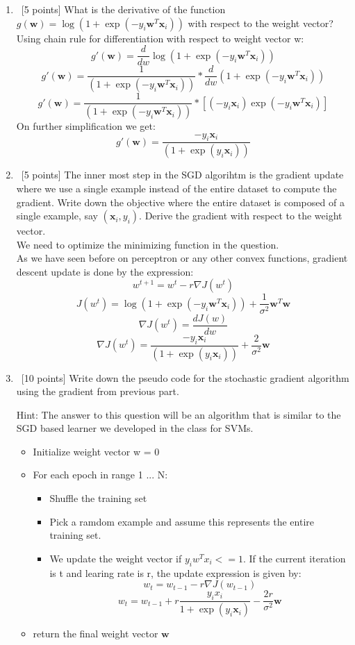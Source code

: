 \begin{enumerate}
\item~[5 points] What is the derivative of the function
  $g(\mathbf{w})=\log(1+\exp(-y_i \mathbf{w}^T\mathbf{x}_i))$ with
  respect to the weight vector?\\
  Using chain rule for differentiation with respect to weight vector w:\\
  \[g'(\mathbf{w})=\frac{d}{dw}\log(1+\exp(-y_i \mathbf{w}^T\mathbf{x}_i))\]
  \[g'(\mathbf{w})=\frac{1}{(1+\exp(-y_i \mathbf{w}^T\mathbf{x}_i))}*\frac{d}{dw}(1+\exp(-y_i \mathbf{w}^T\mathbf{x}_i))\]
  \[g'(\mathbf{w})=\frac{1}{(1+\exp(-y_i \mathbf{w}^T\mathbf{x}_i))}*[(-y_i \mathbf{x}_i)\exp(-y_i\mathbf{w}^T\mathbf{x}_i)]\]
  On further simplification we get:
  \[g'(\mathbf{w})=\frac{-y_i \mathbf{x}_i}{(1+\exp(y_i \mathbf{x}_i))}\]

\item~[5 points] The inner most step in the SGD algorihtm is the
  gradient update where we use a single example instead of the entire
  dataset to compute the gradient.  Write down the objective where the
  entire dataset is composed of a single example, say
  $(\mathbf{x}_i, y_i)$.  Derive the gradient with respect to the
  weight vector.\\
  We need to optimize the minimizing function in the question.\\
  As we have seen before on perceptron or any other convex functions, gradient descent update is done by the expression:\\
  \[w^{t+1} = w^t - r\nabla J(w^t)\]
  \[J(w^t) = \log(1+\exp(-y_i \mathbf{w}^T\mathbf{x}_i)) + \frac{1}{\sigma^2}\mathbf{w}^T\mathbf{w} \]
    \[\nabla J(w^t) = \frac{dJ(w)}{dw}\]
    \[\nabla J(w^t) = \frac{-y_i \mathbf{x}_i}{(1+\exp(y_i \mathbf{x}_i))} + \frac{2}{\sigma^2}\mathbf{w}\]
\item~[10 points] Write down the pseudo code for the stochastic
  gradient algorithm using the gradient from previous part.

  Hint: The answer to this question will be an algorithm that is
  similar to the SGD based learner we developed in the class for SVMs.
\begin{itemize}
    \item Initialize weight vector w = 0
    \item For each epoch in range 1 ... N:
    \begin{itemize}
        \item Shuffle the training set
        \item Pick a ramdom example and assume this represents the entire training set.
        \item We update the weight vector if $y_iw^Tx_i <= 1$. If the current iteration is t and learing rate is r, the update expression is given by:
        \[w_t = w_{t-1} - r\nabla J(w_{t-1})\]
        \[w_t = w_{t-1} + r\frac{y_ix_i}{1+\exp(y_i \mathbf{x}_i)} - \frac{2r}{\sigma^2}\mathbf{w}\]
    \end{itemize}
    \item return the final weight vector $\mathbf{w}$
\end{itemize}
\end{enumerate}

